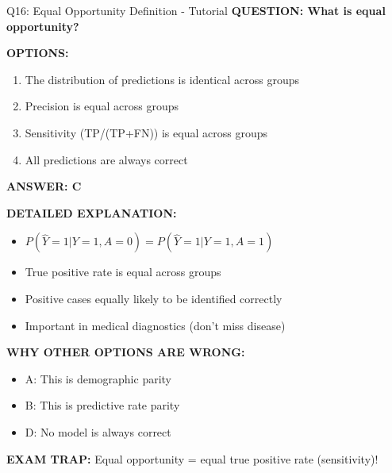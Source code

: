 \documentclass[8pt]{beamer}
\begin{document}
	\begin{frame}{Q16: Equal Opportunity Definition - Tutorial}
		\fontsize{6.5}{7.5}\selectfont
		\textbf{QUESTION: What is equal opportunity?}
		
		\vspace{0.1cm}
		\textbf{OPTIONS:}
		\begin{enumerate}
			\item The distribution of predictions is identical across groups
			\item Precision is equal across groups
			\item Sensitivity (TP/(TP+FN)) is equal across groups
			\item All predictions are always correct
		\end{enumerate}
		
		\vspace{0.1cm}
		\textcolor{myblue}{\textbf{ANSWER: C}}
		
		\vspace{0.1cm}
		\textbf{DETAILED EXPLANATION:}
		\begin{itemize}
			\item $P(\hat{Y}=1|Y=1,A=0) = P(\hat{Y}=1|Y=1,A=1)$
			\item True positive rate is equal across groups
			\item Positive cases equally likely to be identified correctly
			\item Important in medical diagnostics (don't miss disease)
		\end{itemize}
		
		\vspace{0.1cm}
		\textcolor{myred}{\textbf{WHY OTHER OPTIONS ARE WRONG:}}
		\begin{itemize}
			\item \textcolor{myred}{A:} This is demographic parity
			\item \textcolor{myred}{B:} This is predictive rate parity
			\item \textcolor{myred}{D:} No model is always correct
		\end{itemize}
		
		\textcolor{myred}{\textbf{EXAM TRAP:}} Equal opportunity = \textcolor{myblue}{equal true positive rate (sensitivity)}!
	\end{frame}
	
\end{document}
